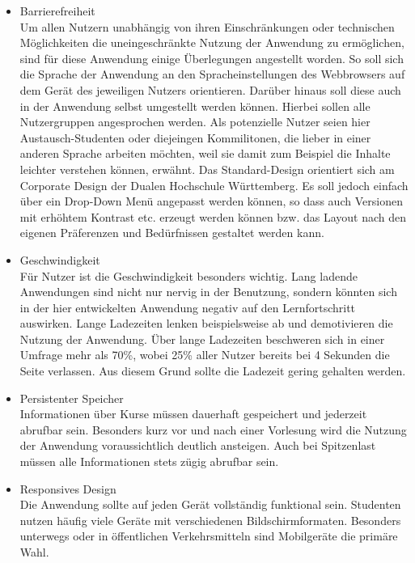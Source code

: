 \begin{itemize}
    \item Barrierefreiheit		\\
        Um allen Nutzern unabhängig von ihren Einschränkungen oder technischen Möglichkeiten die uneingeschränkte Nutzung der Anwendung zu ermöglichen, sind für diese Anwendung einige Überlegungen angestellt worden. So soll sich die Sprache der Anwendung an den Spracheinstellungen des Webbrowsers auf dem Gerät des jeweiligen Nutzers orientieren. Darüber hinaus soll diese auch in der Anwendung selbst umgestellt werden können. Hierbei sollen alle Nutzergruppen angesprochen werden. Als potenzielle Nutzer seien hier Austausch-Studenten oder diejeingen Kommilitonen, die lieber in einer anderen Sprache arbeiten möchten, weil sie damit zum Beispiel die Inhalte leichter verstehen können, erwähnt. Das Standard-Design orientiert sich am Corporate Design der Dualen Hochschule Württemberg. Es soll jedoch einfach über ein Drop-Down Menü angepasst werden können, so dass auch Versionen mit erhöhtem Kontrast etc. erzeugt werden können bzw. das Layout nach den eigenen Präferenzen und Bedürfnissen gestaltet werden kann.
    \item Geschwindigkeit\\
        Für Nutzer ist die Geschwindigkeit besonders wichtig.
        Lang ladende Anwendungen sind nicht nur nervig in der Benutzung, sondern könnten sich in der hier entwickelten Anwendung negativ auf den Lernfortschritt auswirken. Lange Ladezeiten lenken beispielsweise ab und demotivieren die Nutzung der Anwendung.
        Über lange Ladezeiten beschweren sich in einer Umfrage mehr als 70\%, wobei 25\% aller Nutzer bereits bei 4 Sekunden die Seite verlassen.\autocite{loadingTimes}
        Aus diesem Grund sollte die Ladezeit gering gehalten werden.
    \item Persistenter Speicher             \\
        Informationen über Kurse müssen dauerhaft gespeichert und jederzeit abrufbar sein.
        Besonders kurz vor und nach einer Vorlesung wird die Nutzung der Anwendung voraussichtlich deutlich ansteigen.
        Auch bei Spitzenlast müssen alle Informationen stets zügig abrufbar sein.
    \item Responsives Design\\
        Die Anwendung sollte auf jeden Gerät vollständig funktional sein.
        Studenten nutzen häufig viele Geräte mit verschiedenen Bildschirmformaten.
        Besonders unterwegs oder in öffentlichen Verkehrsmitteln sind Mobilgeräte die primäre Wahl.

\end{itemize}
